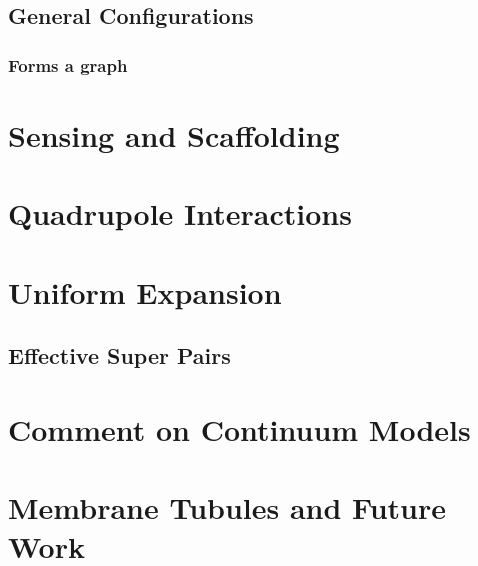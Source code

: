 \subsection{General Configurations}
\subsubsection{Forms a graph}
\section{Sensing and Scaffolding}
\section{Quadrupole Interactions}
\section{Uniform Expansion}
\subsection{Effective Super Pairs}
\section{Comment on Continuum Models}
\section{Membrane Tubules and Future Work}
